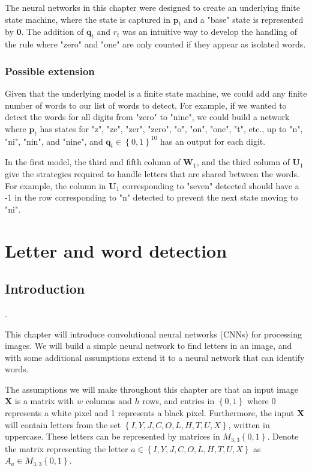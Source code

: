 \documentclass{somasmsc}
\begin{document}
The neural networks in this chapter were designed to create an underlying finite state machine, where the state is captured in $\pmb{p}_t$ and a "base" state is represented by $\mathbf{0}$. The addition of $\pmb{q}_t$ and $r_t$ was an intuitive way to develop the handling of the rule where "zero" and "one" are only counted if they appear as isolated words.

\subsection{Possible extension}

Given that the underlying model is a finite state machine, we could add any finite number of words to our list of words to detect. For example, if we wanted to detect the words for all digits from "zero" to "nine", we could build a network where $\pmb{p}_t$ has states for "z", "ze", "zer", "zero", "o", "on", "one", "t", etc., up to "n", "ni", "nin", and "nine", and $\pmb{q}_t \in \left\{0,1\right\}^{10}$ has an output for each digit.

In the first model, the third and fifth column of $\mathbf{W}_1$, and the third column of $\mathbf{U}_1$ give the strategies required to handle letters that are shared between the words. For example, the column in $\mathbf{U}_1$ corresponding to "seven" detected should have a -1 in the row corresponding to "n" detected to prevent the next state moving to "ni".



\chapter{Letter and word detection}

\section{Introduction}\label{letters:intro}.

This chapter will introduce convolutional neural networks (CNNs) for processing images. We will build a simple neural network to find letters in an image, and with some additional assumptions extend it to a neural network that can identify words.

The assumptions we will make throughout this chapter are that an input image $\mathbf{X}$ is a matrix with $w$ columns and $h$ rows, and entries in $\left\{0,1\right\}$ where 0 represents a white pixel and 1 represents a black pixel. Furthermore, the input $\mathbf{X}$ will contain letters from the set $\left\{I, Y, J, C, O, L, H, T, U, X\right\}$, written in uppercase. These letters can be represented by matrices in $M_{3,3}\left\{0,1\right\}$. Denote the matrix representing the letter $a \in \left\{I, Y, J, C, O, L, H, T, U, X\right\}$ as $A_a \in M_{3,3}\left\{0,1\right\}$.
\end{document}
